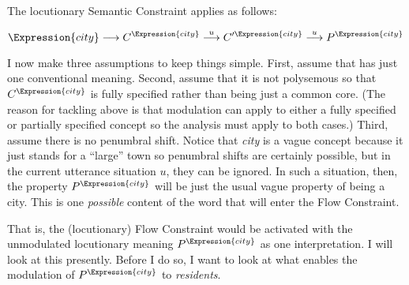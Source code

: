 The locutionary Semantic Constraint applies as follows:

\[ \Expression{city} \longrightarrow C^{\Expression{city}} \stackrel{u}\longrightarrow C'^{\Expression{city}} \stackrel{u}\longrightarrow P^\Expression{city} \]

\noindent I now make three assumptions to keep things simple. First, assume that  has just one conventional meaning. Second, assume that it is not polysemous so that $C^{\Expression{city}}$ is fully specified rather than being just a common core. (The reason for tackling  above is that modulation can apply to either a fully specified or partially specified concept so the analysis must apply to both cases.) Third, assume there is no penumbral shift. Notice that \emph{city} is a vague concept because it just stands for a ``large'' town so penumbral shifts are certainly possible, but in the current utterance situation $u$, they can be ignored. In such a situation, then, the property $P^\Expression{city}$ will be just the usual vague property of being a city. This is one \emph{possible} content of the word that will enter the Flow Constraint.


That is, the (locutionary) Flow Constraint would be activated with the unmodulated locutionary meaning $P^\Expression{city}$ as one interpretation. I will look at this presently. Before I do so, I want to look at what enables the modulation of $P^\Expression{city}$ to \emph{residents}.

